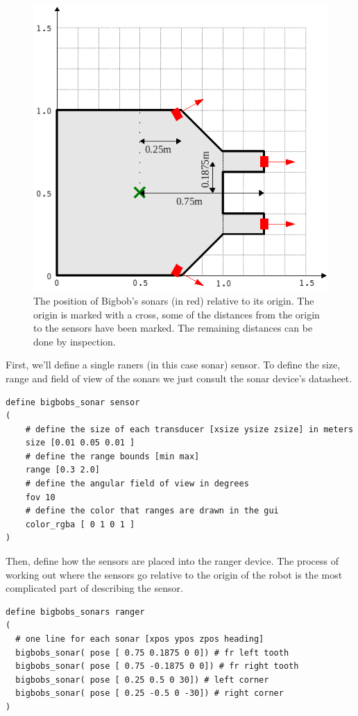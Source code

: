 \documentclass[a4paper]{report}
\begin{document}
\begin{figure}
	\centering
	\includegraphics[width=0.6\linewidth]{./pics/robot_building/bigbob_sonars.png} 
	\caption{The position of Bigbob's sonars (in red) relative to its origin. The origin is marked with a cross, some of the distances from the origin to the sensors have been marked. The remaining distances can be done by inspection.}
	\label{fig:BuildingAWorld:BuildingRobot:RobotSensors:Sonars}
\end{figure}

First, we'll define a single raners (in this case sonar) sensor.
To define the size, range and field of view of the sonars we just consult the
sonar device's datasheet.  
\begin{verbatim}
define bigbobs_sonar sensor
(
    # define the size of each transducer [xsize ysize zsize] in meters
    size [0.01 0.05 0.01 ] 
    # define the range bounds [min max]
    range [0.3 2.0]
    # define the angular field of view in degrees
    fov 10
    # define the color that ranges are drawn in the gui
    color_rgba [ 0 1 0 1 ] 
)
\end{verbatim}

Then, define how the sensors are placed into the ranger device.
The process of working out where the sensors go relative to the origin of the
robot is the most complicated part of describing the sensor.
\begin{verbatim}
define bigbobs_sonars ranger
( 
  # one line for each sonar [xpos ypos zpos heading]
  bigbobs_sonar( pose [ 0.75 0.1875 0 0]) # fr left tooth
  bigbobs_sonar( pose [ 0.75 -0.1875 0 0]) # fr right tooth
  bigbobs_sonar( pose [ 0.25 0.5 0 30]) # left corner
  bigbobs_sonar( pose [ 0.25 -0.5 0 -30]) # right corner
)
\end{verbatim}
\end{document}
